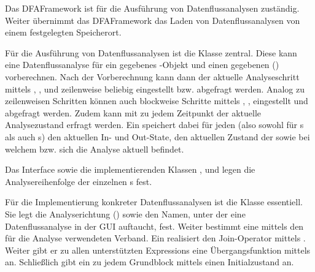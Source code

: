 
Das DFAFramework ist für die Ausführung von Datenflussanalysen zuständig.
Weiter übernimmt das DFAFramework das Laden von Datenflussanalysen von einem festgelegten Speicherort.

Für die Ausführung von Datenflussanalysen ist die Klasse  zentral.
Diese kann eine Datenflussanalyse für ein gegebenes -Objekt und einen gegebenen  () vorberechnen.
Nach der Vorberechnung kann dann der aktuelle Analyseschritt mittels , ,  und  zeilenweise beliebig eingestellt bzw. abgefragt werden. 
Analog zu zeilenweisen Schritten können auch blockweise Schritte mittels , ,  eingestellt und abgefragt werden.
Zudem kann mit  zu jedem Zeitpunkt der aktuelle Analysezustand erfragt werden.
Ein  speichert dabei für jeden  (also sowohl für s als auch s) den aktuellen In- und Out-State, den aktuellen Zustand der  sowie bei welchem  bzw.  sich die Analyse aktuell befindet.

Das Interface  sowie die implementierenden Klassen ,  und  legen die Analysereihenfolge der einzelnen s fest.

Für die Implementierung konkreter Datenflussanalysen ist die Klasse  essentiell.
Sie legt die Analyserichtung () sowie den Namen, unter der eine Datenflussanalyse in der GUI auftaucht, fest.
Weiter bestimmt eine  mittels  den für die Analyse verwendeten Verband.
Ein  realisiert den Join-Operator mittels .
Weiter gibt er zu allen unterstützten Expressions eine Übergangsfunktion mittels  an.
Schließlich gibt ein  zu jedem Grundblock mittels  einen Initialzustand an.

